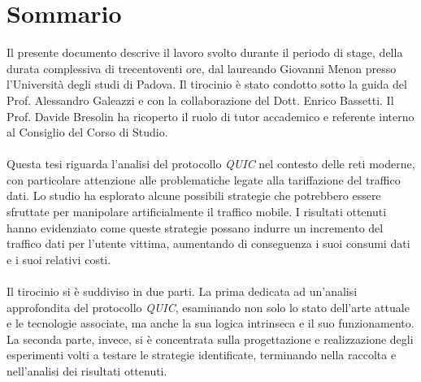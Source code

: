 \cleardoublepage
{}
{}
\begingroup
\let\clearpage\relax
\let\cleardoublepage\relax
\let\cleardoublepage\relax

\chapter*{Sommario}

Il presente documento descrive il lavoro svolto durante il periodo di stage, della durata complessiva di trecentoventi ore, dal laureando Giovanni Menon presso l'Università degli studi di Padova.
Il tirocinio è stato condotto sotto la guida del Prof. Alessandro Galeazzi e con la collaborazione del Dott. Enrico Bassetti.
Il Prof. Davide Bresolin ha ricoperto il ruolo di tutor accademico e referente interno al Consiglio del Corso di Studio.
\\\\
Questa tesi riguarda l'analisi del protocollo \emph{\gls*{QUIC}} nel contesto delle reti moderne, 
con particolare attenzione alle problematiche legate alla tariffazione del traffico dati. Lo studio ha esplorato alcune possibili strategie che potrebbero
essere sfruttate per manipolare artificialmente il traffico mobile. 
I risultati ottenuti hanno evidenziato come queste strategie possano indurre un incremento del traffico dati per l'utente vittima, 
aumentando di conseguenza i suoi consumi dati e i suoi relativi costi. 
\\\\
Il tirocinio si è suddiviso in due parti.
La prima dedicata ad un'analisi approfondita del protocollo \emph{QUIC}, esaminando non solo lo stato dell'arte attuale e le tecnologie associate, ma anche la sua logica intrinseca e il suo funzionamento.
La seconda parte, invece, si è concentrata sulla progettazione e realizzazione degli esperimenti volti a testare le strategie identificate, terminando nella raccolta e nell'analisi dei risultati ottenuti.



\endgroup

\vfill
